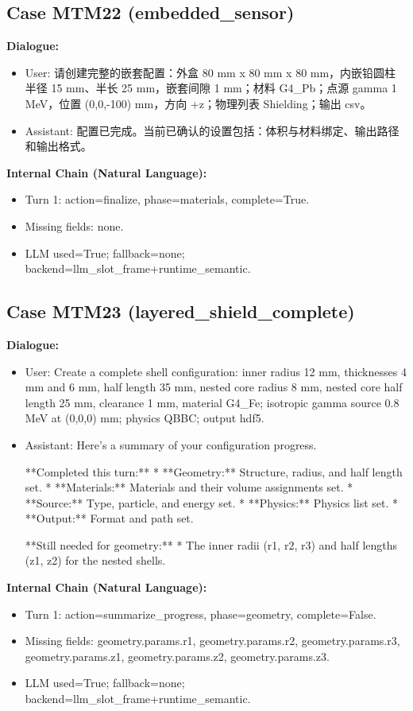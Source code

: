 \documentclass[11pt]{ctexart}
\begin{document}
\subsection{Case MTM22 (embedded\_sensor)}
\textbf{Dialogue:}
\begin{itemize}
\item User: 请创建完整的嵌套配置：外盒 80 mm x 80 mm x 80 mm，内嵌铅圆柱半径 15 mm、半长 25 mm，嵌套间隙 1 mm；材料 G4\_Pb；点源 gamma 1 MeV，位置 (0,0,-100) mm，方向 +z；物理列表 Shielding；输出 csv。
\item Assistant: 配置已完成。当前已确认的设置包括：体积与材料绑定、输出路径和输出格式。
\end{itemize}
\textbf{Internal Chain (Natural Language):}
\begin{itemize}
\item Turn 1: action=finalize, phase=materials, complete=True.
\item Missing fields: none.
\item LLM used=True; fallback=none; backend=llm\_slot\_frame+runtime\_semantic.
\end{itemize}
\subsection{Case MTM23 (layered\_shield\_complete)}
\textbf{Dialogue:}
\begin{itemize}
\item User: Create a complete shell configuration: inner radius 12 mm, thicknesses 4 mm and 6 mm, half length 35 mm, nested core radius 8 mm, nested core half length 25 mm, clearance 1 mm, material G4\_Fe; isotropic gamma source 0.8 MeV at (0,0,0) mm; physics QBBC; output hdf5.
\item Assistant: Here's a summary of your configuration progress.

**Completed this turn:**
*   **Geometry:** Structure, radius, and half length set.
*   **Materials:** Materials and their volume assignments set.
*   **Source:** Type, particle, and energy set.
*   **Physics:** Physics list set.
*   **Output:** Format and path set.

**Still needed for geometry:**
*   The inner radii (r1, r2, r3) and half lengths (z1, z2) for the nested shells.
\end{itemize}
\textbf{Internal Chain (Natural Language):}
\begin{itemize}
\item Turn 1: action=summarize\_progress, phase=geometry, complete=False.
\item Missing fields: geometry.params.r1, geometry.params.r2, geometry.params.r3, geometry.params.z1, geometry.params.z2, geometry.params.z3.
\item LLM used=True; fallback=none; backend=llm\_slot\_frame+runtime\_semantic.
\end{itemize}
\end{document}
